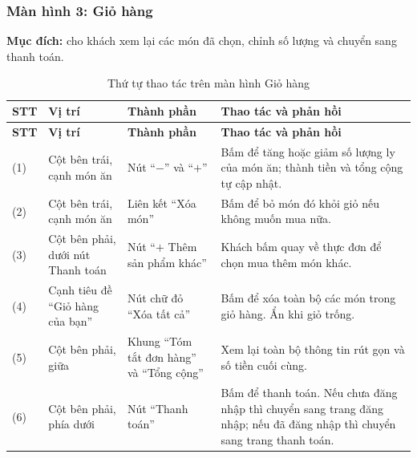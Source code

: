 \subsubsection{Màn hình 3: Giỏ hàng}
\label{subsec:wf-giohang}
\textbf{Mục đích:} cho khách xem lại các món đã chọn, chỉnh số lượng và chuyển sang thanh toán.

\begin{minipage}{\textwidth}
\centering
{}
\label{fig:wf-giohang}
\end{minipage}
\vspace{10pt}

\begin{longtable}{|p{1.0cm}|p{2.5cm}|p{4.5cm}|p{5.5cm}|}
  \caption{Thứ tự thao tác trên màn hình Giỏ hàng}\label{tab:wf-giohang}\\
  \hline
  \textbf{STT} & \textbf{Vị trí} & \textbf{Thành phần} & \textbf{Thao tác và phản hồi} \\
  \hline
  \endfirsthead
  \hline
  \textbf{STT} & \textbf{Vị trí} & \textbf{Thành phần} & \textbf{Thao tác và phản hồi} \\
  \hline
  \endhead
  (1) & Cột bên trái, cạnh món ăn & Nút ``$-$'' và ``$+$'' & Bấm để tăng hoặc giảm số lượng ly của món ăn; thành tiền và tổng cộng tự cập nhật. \\
  \hline
  (2) & Cột bên trái, cạnh món ăn & Liên kết ``Xóa món'' & Bấm để bỏ món đó khỏi giỏ nếu không muốn mua nữa. \\
  \hline
  (3) & Cột bên phải, dưới nút Thanh toán & Nút ``$+$ Thêm sản phẩm khác'' & Khách bấm quay về thực đơn để chọn mua thêm món khác. \\
  \hline
  (4) & Cạnh tiêu đề ``Giỏ hàng của bạn'' & Nút chữ đỏ ``Xóa tất cả'' & Bấm để xóa toàn bộ các món trong giỏ hàng. Ẩn khi giỏ trống. \\
  \hline
  (5) & Cột bên phải, giữa & Khung ``Tóm tắt đơn hàng'' và ``Tổng cộng'' & Xem lại toàn bộ thông tin rút gọn và số tiền cuối cùng. \\
  \hline
  (6) & Cột bên phải, phía dưới & Nút ``Thanh toán'' & Bấm để thanh toán. Nếu chưa đăng nhập thì chuyển sang trang đăng nhập; nếu đã đăng nhập thì chuyển sang trang thanh toán. \\
  \hline
\end{longtable}

